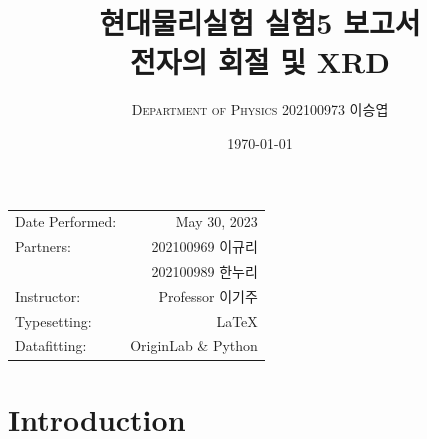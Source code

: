 \documentclass[a4paper, 10pt, nanum]{CSUniSchoolLabReport}
\title{현대물리실험 실험5 보고서 \\ 전자의 회절 및 XRD} %
\author{\textsc{Department of Physics} 202100973 이승엽}
\date{\today}
\begin{document}
\maketitle %

\begin{center}
	\begin{tabular}{l r}
		Date Performed: & May 30, 2023 \\ %
		Partners: & 202100969 이규리 \\ %
		& 202100989 한누리 \\
		Instructor: & Professor 이기주 \\ %
		Typesetting: & LaTeX \\
		Datafitting: & OriginLab \& Python \\
	\end{tabular}
\end{center}


\maketitle


\section{Introduction}
\end{document}
